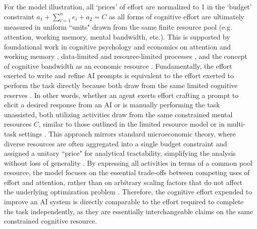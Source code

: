 For the model illustration, all `prices' of effort are normalized to 1 in the `budget' constraint $a_1 + \sum_{i=1}^{n} e_i + a_2 = C$ as all forms of cognitive effort are ultimately measured in uniform ``units" drawn from the same finite resource pool (e.g. attention, working memory, mental bandwidth, etc.). This is supported by foundational work in cognitive psychology and economics on attention and working memory \citep{kahneman1973attention, baddeley1992working}, data-limited and resource-limited processes \citep{norman1975data}, and the concept of cognitive bandwidth as an economic resource \citep{navon1979economy, caplin2016measuring, loewenstein2023economics}. Fundamentally, the effort exerted to write and refine AI prompts is equivalent to the effort exerted to perform the task directly because both draw from the same limited cognitive reserves \citep{zamfirescu2023johnny}. In other words, whether an agent exerts effort crafting a prompt to elicit a desired response from an AI or is manually performing the task unassisted, both utilizing activities draw from the same constrained mental resources $C$, similar to those outlined in the limited resource model \citep{norman1975data} or in multi-task settings \citep{borghini2012assessment}. This approach mirrors standard microeconomic theory, where diverse resources are often aggregated into a single budget constraint and assigned a unitary ``price" for analytical tractability, simplifying the analysis without loss of generality \citep{becker1965theory,varian1992microeconomic}. By expressing all activities in terms of a common pool resource, the model focuses on the essential trade-offs between competing uses of effort and attention, rather than on arbitrary scaling factors that do not affect the underlying optimization problem \citep{RePEc:oxp:obooks:9780195102680}. Therefore, the cognitive effort expended to improve an AI system is directly comparable to the effort required to complete the task independently, as they are essentially interchangeable claims on the same constrained cognitive resource.

